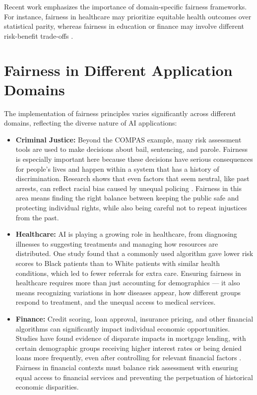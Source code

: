 \documentclass[12pt,a4paper,openright,twoside]{book}
\begin{document}
Recent work emphasizes the importance of domain-specific fairness frameworks. For instance, fairness in healthcare may prioritize equitable health outcomes over statistical parity, whereas fairness in education or finance may involve different risk-benefit trade-offs \cite{mehrabi2021survey}.


\section{Fairness in Different Application Domains}
The implementation of fairness principles varies significantly across different domains, reflecting the diverse nature of AI applications:

\begin{itemize}
    \item\textbf{Criminal Justice:} Beyond the COMPAS example, many risk assessment tools are used to make decisions about bail, sentencing, and parole. Fairness is especially important here because these decisions have serious consequences for people’s lives and happen within a system that has a history of discrimination. Research shows that even factors that seem neutral, like past arrests, can reflect racial bias caused by unequal policing \cite{berk2017fairness, ensign2018runaway}. Fairness in this area means finding the right balance between keeping the public safe and protecting individual rights, while also being careful not to repeat injustices from the past.
    
    \item \textbf{Healthcare:} AI is playing a growing role in healthcare, from diagnosing illnesses to suggesting treatments and managing how resources are distributed. One study \cite{obermeyer2019dissecting} found that a commonly used algorithm gave lower risk scores to Black patients than to White patients with similar health conditions, which led to fewer referrals for extra care. Ensuring fairness in healthcare requires more than just accounting for demographics — it also means recognizing variations in how diseases appear, how different groups respond to treatment, and the unequal access to medical services.
    
    \item \textbf{Finance:} Credit scoring, loan approval, insurance pricing, and other financial algorithms can significantly impact individual economic opportunities. Studies have found evidence of disparate impacts in mortgage lending, with certain demographic groups receiving higher interest rates or being denied loans more frequently, even after controlling for relevant financial factors \cite{bartlett2022consumer}. Fairness in financial contexts must balance risk assessment with ensuring equal access to financial services and preventing the perpetuation of historical economic disparities.
    

\end{itemize}
\end{document}
